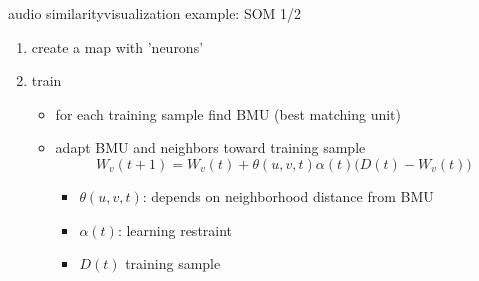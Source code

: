         \begin{frame}{audio similarity}{visualization example: SOM 1/2}
            \vspace{-3mm}
                    \begin{enumerate}
                        \item	create a map with 'neurons'
                        \item<1->	train
                                \begin{itemize}
                                    \item	for each training sample find BMU (best matching unit)
                                    \item	adapt BMU and neighbors toward training sample
                                    \begin{equation*}
                                        W_v(t + 1) = W_v(t) + \theta (u, v, t) \alpha(t)\big(D(t) - W_v(t)\big)
                                    \end{equation*}
                                    \begin{footnotesize}
                                        \begin{itemize}
                                            \item	$\theta (u, v, t)$: depends on neighborhood distance from BMU
                                            \item	$\alpha (t)$: learning restraint
                                            \item	$D(t)$ training sample
                                        \end{itemize}
                                    \end{footnotesize}
                                \end{itemize}
                    \end{enumerate}
        \end{frame}
